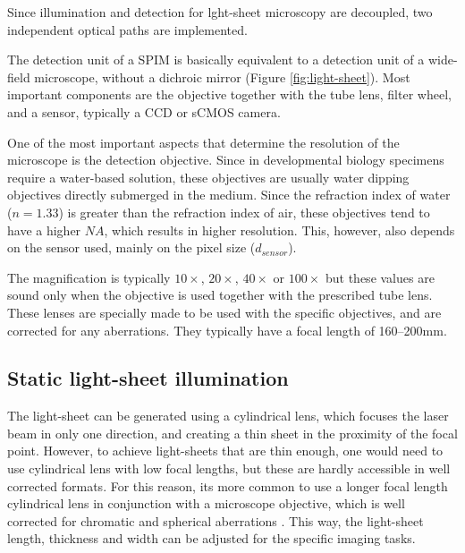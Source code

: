     Since illumination and detection for lght-sheet microscopy are decoupled, two independent optical paths are implemented.

    The detection unit of a SPIM is basically equivalent to a detection unit of a wide-field microscope, without a dichroic mirror (Figure \ref{fig:light-sheet}). Most important components are the objective together with the tube lens, filter wheel, and a sensor, typically a CCD or sCMOS camera.

    One of the most important aspects that determine the resolution of the microscope is the detection objective. Since in developmental biology specimens require a water-based solution, these objectives are usually water dipping objectives directly submerged in the medium. Since the refraction index of water ($n=1.33$) is greater than the refraction index of air, these objectives tend to have a higher $NA$, which results in higher resolution. This, however, also depends on the sensor used, mainly on the pixel size ($d_{sensor}$).

    The magnification is typically $10\times$, $20\times$, $40\times$ or $100\times$ but these values are sound only when the objective is used together with the prescribed tube lens. These lenses are specially made to be used with the specific objectives, and are corrected for any aberrations. They typically have a focal length of 160--200mm.



    \subsection{Static light-sheet illumination}
      The light-sheet can be generated using a cylindrical lens, which focuses the laser beam in only one direction, and creating a thin sheet in the proximity of the focal point. However, to achieve light-sheets that are thin enough, one would need to use cylindrical lens with low focal lengths, but these are hardly accessible in well corrected formats. For this reason, its more common to use a longer focal length cylindrical lens in conjunction with a microscope objective, which is well corrected for chromatic and spherical aberrations \cite{greger_basic_2007}. This way, the light-sheet length, thickness and width can be adjusted for the specific imaging tasks.

